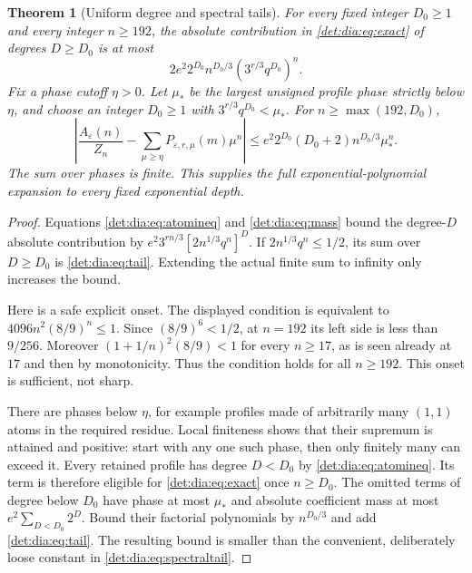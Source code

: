 \documentclass[11pt,letterpaper]{article}
\numberwithin{equation}{section}
\newtheorem{theorem}{Theorem}[section]
\theoremstyle{definition}\newtheorem{definition}[theorem]{Definition}
\theoremstyle{remark}\newtheorem{remark}[theorem]{Remark}
\newcommand{\eps}{\varepsilon}
\begin{document}
\begin{theorem}[Uniform degree and spectral tails]\label{det:dia:thm:tail}
For every fixed integer $D_0\geq1$ and every integer $n\geq192$, the
absolute contribution in \eqref{det:dia:eq:exact} of degrees $D\geq D_0$ is at
most
\begin{equation}\label{det:dia:eq:tail}
 2e^2 2^{D_0}n^{D_0/3}
 \left(3^{r/3}q^{D_0}\right)^n.
\end{equation}
Fix a phase cutoff $\eta>0$. Let $\mu_*$ be the largest unsigned profile
phase strictly below $\eta$, and choose an integer $D_0\geq1$ with
$3^{r/3}q^{D_0}<\mu_*$. For $n\geq\max(192,D_0)$,
\begin{equation}\label{det:dia:eq:spectraltail}
 \left|\frac{A_\eps(n)}{Z_n}-
 \sum_{\mu\geq\eta}P_{\eps,r,\mu}(m)\mu^n\right|
 \leq e^2 2^{D_0}(D_0+2)n^{D_0/3}\mu_*^n.
\end{equation}
The sum over phases is finite. This supplies the full exponential-polynomial
expansion to every fixed exponential depth.
\end{theorem}
\begin{proof}
Equations \eqref{det:dia:eq:atomineq} and \eqref{det:dia:eq:mass} bound the degree-$D$
absolute contribution by
$e^2 3^{rn/3}[2n^{1/3}q^n]^D$. If
$2n^{1/3}q^n\leq1/2$, its sum over $D\geq D_0$ is
\eqref{det:dia:eq:tail}. Extending the actual finite sum to infinity only
increases the bound.

Here is a safe explicit onset. The displayed condition is equivalent to
$4096n^2(8/9)^n\leq1$. Since $(8/9)^6<1/2$, at $n=192$ its left side
is less than $9/256$. Moreover
$(1+1/n)^2(8/9)<1$ for every $n\geq17$, as is seen already at $17$
and then by monotonicity. Thus the condition holds for all $n\geq192$.
This onset is sufficient, not sharp.

There are phases below $\eta$, for example profiles made of arbitrarily
many $(1,1)$ atoms in the required residue. Local finiteness shows that
their supremum is attained and positive: start with any one such phase,
then only finitely many can exceed it. Every retained profile has degree
$D<D_0$ by \eqref{det:dia:eq:atomineq}. Its term is therefore eligible for
\eqref{det:dia:eq:exact} once $n\geq D_0$. The omitted terms of degree below
$D_0$ have phase at most $\mu_*$ and absolute coefficient mass at most
$e^2\sum_{D<D_0}2^D$. Bound their factorial polynomials by $n^{D_0/3}$
and add \eqref{det:dia:eq:tail}. The resulting bound is smaller than the
convenient, deliberately loose constant in \eqref{det:dia:eq:spectraltail}.
\end{proof}
\end{document}
